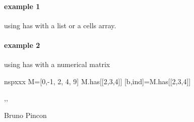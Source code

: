 \begin{examples}
  
\paragraph{example 1} using has with a list or a cells array. 
   
\paragraph{example 2} using has with a numerical matrix
\begin{mintednsp}{nspxxx}
M=[0,-1, 2, 4, 9]
M.has[[2,3,4]]
[b,ind]=M.has[[2,3,4]]
\end{mintednsp}
   
\end{examples}

\begin{manseealso}
  ,,   
\end{manseealso}

\begin{authors}
  Bruno Pincon
\end{authors}
